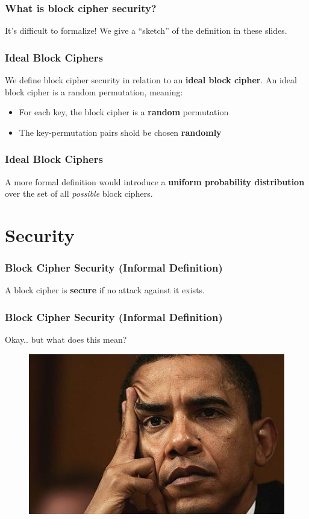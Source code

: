 \documentclass{beamer}
\newcommand{\<}{\langle}
\renewcommand{\>}{\rangle}
\begin{document}
\begin{frame}
\frametitle{What is block cipher security?}

It's difficult to formalize! We give a ``sketch'' of the definition in these slides.
\end{frame}


\begin{frame}
\frametitle{Ideal Block Ciphers}

We define block cipher security in relation to an \textbf{ideal block cipher}. An ideal block cipher is a random permutation, meaning:
\begin{itemize}
\item For each key, the block cipher is a \textbf{random} permutation
\item The key-permutation pairs shold be chosen \textbf{randomly}
\end{itemize}
\end{frame}


\begin{frame}
\frametitle{Ideal Block Ciphers}

A more formal definition would introduce a \textbf{uniform probability distribution} over the set of all \emph{possible} block ciphers. 
\end{frame}


\section{Security}
\begin{frame}
\frametitle{Block Cipher Security (Informal Definition)}

A block cipher is \textbf{secure} if no attack against it exists.
\end{frame}


\begin{frame}
\frametitle{Block Cipher Security (Informal Definition)}

Okay.. but what does this mean?

\begin{figure}
\includegraphics[scale=.5]{IMG/confused2}
\end{figure}
\end{frame}
\end{document}
